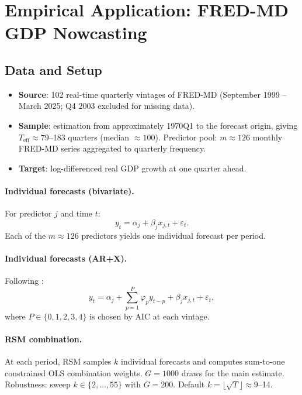 \documentclass[12pt,a4paper]{article}
\theoremstyle{definition}
\begin{document}
\section{Empirical Application: FRED-MD GDP Nowcasting}
\label{sec:gdp}

\subsection{Data and Setup}

\begin{itemize}[nosep]
\item \textbf{Source}: 102 real-time quarterly vintages of FRED-MD
  (September 1999 -- March 2025; Q4 2003 excluded for missing data).
\item \textbf{Sample}: estimation from approximately 1970Q1 to the
  forecast origin, giving $T_{\mathrm{eff}}\approx79$--183 quarters
  (median $\approx100$). Predictor pool: $m\approx126$ monthly FRED-MD
  series aggregated to quarterly frequency.
\item \textbf{Target}: log-differenced real GDP growth at one quarter ahead.
\end{itemize}

\paragraph{Individual forecasts (bivariate).}
For predictor $j$ and time $t$:
\begin{equation}
y_t = \alpha_j + \beta_j x_{j,t} + \varepsilon_t.
\end{equation}
Each of the $m\approx126$ predictors yields one individual forecast per period.

\paragraph{Individual forecasts (AR+X).}
Following \citet{ElliottEtAl2015}:
\begin{equation}
y_t = \alpha_j + \sum_{p=1}^P\varphi_p y_{t-p} + \beta_j x_{j,t} + \varepsilon_t,
\end{equation}
where $P\in\{0,1,2,3,4\}$ is chosen by AIC at each vintage.

\paragraph{RSM combination.}
At each period, RSM samples $k$ individual forecasts and computes
sum-to-one constrained OLS combination weights. $G=1000$ draws for
the main estimate. Robustness: sweep $k\in\{2,\ldots,55\}$ with $G=200$.
Default $k=\lfloor\sqrt{T}\rfloor\approx9$--14.
\end{document}
